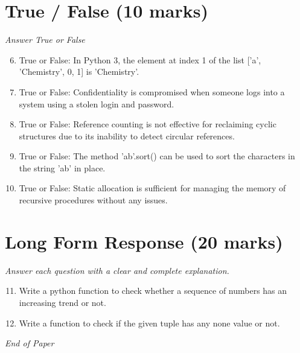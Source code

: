 \documentclass[12pt]{article}
\begin{document}
\section*{True / False (10 marks)}
\textit{Answer True or False}
\begin{enumerate}[label=\arabic*.]
\setcounter{enumi}{5}
\item True or False: In Python 3, the element at index 1 of the list ['a', 'Chemistry', 0, 1] is 'Chemistry'.
\item True or False: Confidentiality is compromised when someone logs into a system using a stolen login and password.
\item True or False: Reference counting is not effective for reclaiming cyclic structures due to its inability to detect circular references.
\item True or False: The method 'ab'.sort() can be used to sort the characters in the string 'ab' in place.
\item True or False: Static allocation is sufficient for managing the memory of recursive procedures without any issues.
\end{enumerate}

\section*{Long Form Response (20 marks)}
\textit{Answer each question with a clear and complete explanation.}
\begin{enumerate}[label=\arabic*.]
\setcounter{enumi}{10}
\item Write a python function to check whether a sequence of numbers has an increasing trend or not.
\item Write a function to check if the given tuple has any none value or not.
\end{enumerate}

\vfill
\noindent\textit{End of Paper}
\end{document}
